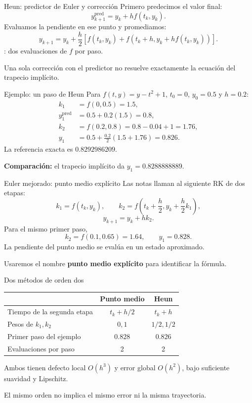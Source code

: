 \documentclass[aspectratio=169,12pt]{beamer}
\begin{document}
\begin{frame}{Heun: predictor de Euler y corrección}
Primero predecimos el valor final:
\[y_{k+1}^{\mathrm{pred}}=y_k+hf(t_k,y_k).\]
Evaluamos la pendiente en ese punto y promediamos:
\[\boxed{y_{k+1}=y_k+\frac h2\left[f(t_k,y_k)+
f(t_k+h,y_k+hf(t_k,y_k))\right].}\]
: dos evaluaciones de $f$ por paso.
\medskip

Una sola corrección con el predictor no resuelve exactamente la ecuación del trapecio implícito.
\end{frame}

\begin{frame}{Ejemplo: un paso de Heun}
Para $f(t,y)=y-t^2+1$, $t_0=0$, $y_0=0.5$ y $h=0.2$:
\begin{align*}
k_1&=f(0,0.5)=1.5,\\
y_1^{\mathrm{pred}}&=0.5+0.2(1.5)=0.8,\\
k_2&=f(0.2,0.8)=0.8-0.04+1=1.76,\\
y_1&=0.5+\frac{0.2}{2}(1.5+1.76)=\boxed{0.826}.
\end{align*}
La referencia exacta es $0.8292986209$.
\medskip

\textbf{Comparación:} el trapecio implícito da $y_1=0.8288888889$.
\end{frame}

\begin{frame}{Euler mejorado: punto medio explícito}
Las notas llaman  al siguiente RK de dos etapas:
\[k_1=f(t_k,y_k),\qquad
k_2=f\!\left(t_k+\frac h2,y_k+\frac h2k_1\right),\]
\[\boxed{y_{k+1}=y_k+h k_2.}\]
Para el mismo primer paso,
\[k_2=f(0.1,0.65)=1.64,\qquad y_1=\boxed{0.828}.\]
La pendiente del punto medio se evalúa en un estado aproximado.
\medskip

Usaremos el nombre \textbf{punto medio explícito} para identificar la fórmula.
\end{frame}

\begin{frame}{Dos métodos de orden dos}
\begin{center}
\begin{tabular}{lcc}\toprule
&Punto medio&Heun\\\midrule
Tiempo de la segunda etapa&$t_k+h/2$&$t_k+h$\\[2mm]
Pesos de $k_1,k_2$&$0,1$&$1/2,1/2$\\[2mm]
Primer paso del ejemplo&$0.828$&$0.826$\\[2mm]
Evaluaciones por paso&2&2\\\bottomrule
\end{tabular}
\end{center}
Ambos tienen defecto local $O(h^3)$ y error global $O(h^2)$, bajo suficiente suavidad y Lipschitz.
\medskip

El mismo orden no implica el mismo error ni la misma trayectoria.
\end{frame}
\end{document}
